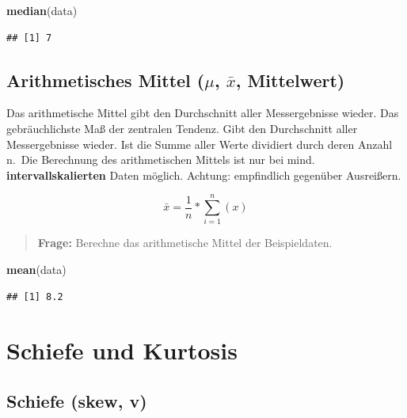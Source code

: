 \documentclass[
]{book}
\newenvironment{Shaded}{\begin{snugshade}}{\end{snugshade}}
\newcommand{\KeywordTok}[1]{\textcolor[rgb]{0.13,0.29,0.53}{\textbf{#1}}}
\newcommand{\NormalTok}[1]{#1}
\begin{document}
\begin{Shaded}
\begin{Highlighting}[]
\KeywordTok{median}\NormalTok{(data)}
\end{Highlighting}
\end{Shaded}

\begin{verbatim}
## [1] 7
\end{verbatim}

\hypertarget{arithmetisches-mittel-mu-barx-mittelwert}{%
\subsection{\texorpdfstring{Arithmetisches Mittel (\(\mu\), \(\bar{x}\), Mittelwert)}{Arithmetisches Mittel (\textbackslash mu, \textbackslash bar\{x\}, Mittelwert)}}\label{arithmetisches-mittel-mu-barx-mittelwert}}

Das arithmetische Mittel gibt den Durchschnitt aller Messergebnisse wieder. Das gebräuchlichste Maß der zentralen Tendenz. Gibt den Durchschnitt aller Messergebnisse wieder. Ist die Summe aller Werte dividiert durch deren Anzahl n.~Die Berechnung des arithmetischen Mittels ist nur bei mind. \textbf{intervallskalierten} Daten möglich. Achtung: empfindlich gegenüber Ausreißern.

\[ \bar{x} = \frac{1}{n}*\sum_{i=1}^{n}(x) \]

\begin{quote}
\textbf{Frage:} Berechne das arithmetische Mittel der Beispieldaten.
\end{quote}

\begin{Shaded}
\begin{Highlighting}[]
\KeywordTok{mean}\NormalTok{(data)}
\end{Highlighting}
\end{Shaded}

\begin{verbatim}
## [1] 8.2
\end{verbatim}

\hypertarget{schiefe-und-kurtosis}{%
\section{Schiefe und Kurtosis}\label{schiefe-und-kurtosis}}

\hypertarget{schiefe-skew-v}{%
\subsection{Schiefe (skew, v)}\label{schiefe-skew-v}}
\end{document}
